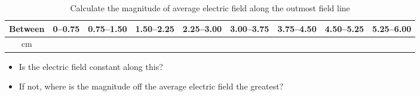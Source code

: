 \documentclass[a4paper]{article}
\begin{document}
\begin{table}[h!]
  \begin{center}
    \caption{Calculate the magnitude of average electric field along the outmost field line}\label{tab:table1}
    \begin{tabular}{|c|c|c|c|c|c|c|c|c|}\hline
      Between & 0--0.75 & 0.75--1.50 & 1.50--2.25 & 2.25--3.00 & 3.00--3.75 & 3.75--4.50 & 4.50--5.25 & 5.25--6.00 \\ \hline
      cm & & & & & & & & \\ \hline
    \end{tabular}
  \end{center}
\end{table}
\begin{itemize}
  \item Is the electric field constant along this?
  \item If not, where is the magnitude off the average electric field the greatest?
\end{itemize}
\end{document}
